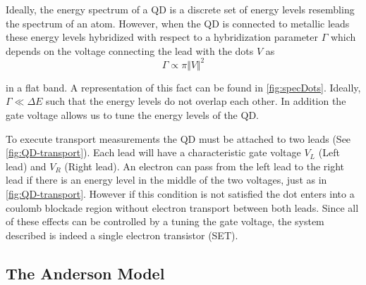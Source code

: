 Ideally, the energy spectrum of a QD is a discrete set of energy levels resembling the spectrum of an atom. However, when the QD is connected to metallic leads these energy levels hybridized with respect to a hybridization parameter $\Gamma$ which depends on the voltage connecting the lead with the dots $V$ as 
\begin{equation}
    \Gamma \propto \pi \Vert V \Vert^2
\end{equation}

in a flat band. A representation of this fact can be found in  \ref{fig:specDots}. Ideally, $\Gamma \ll \Delta E$ such that the energy levels do not overlap each other. In addition the gate voltage allows us to tune the energy levels of the QD.

To execute transport measurements the QD must be attached to two leads (See \ref{fig:QD-transport}). Each lead will have a characteristic gate voltage $V_L$ (Left lead) and $V_R$ (Right lead). An electron can pass from the left lead to the right lead if there is an energy level in the middle of the two voltages, just as in \ref{fig:QD-transport}. However if this condition is not satisfied the dot enters into a coulomb blockade region without  electron transport between both leads. Since all of these effects can be controlled by a tuning the gate voltage, the system described is indeed a single electron transistor (SET).  












\subsection{The Anderson Model}

